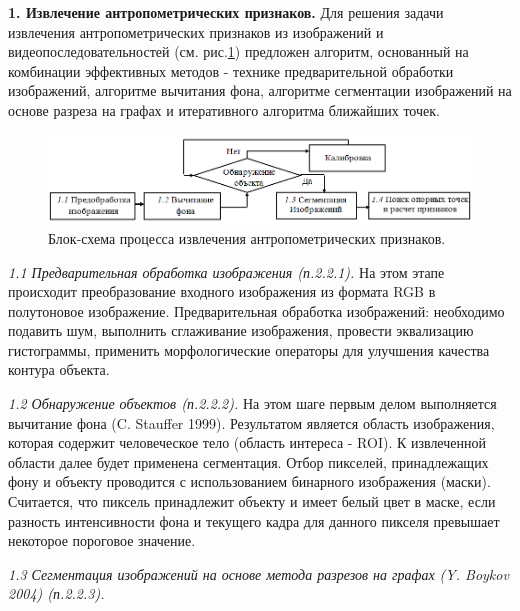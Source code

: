 \textbf{1. Извлечение антропометрических признаков.} Для решения задачи извлечения антропометрических признаков из изображений и видеопоследовательностей (см. рис.\ref{img53}) предложен алгоритм, основанный на комбинации эффективных методов - технике предварительной обработки изображений, алгоритме вычитания фона, алгоритме сегментации изображений на основе разреза на графах и итеративного алгоритма ближайших точек.
\begin{figure}[ht!]
\centering
\includegraphics [width=1\linewidth] {images/h53.png}
\begin{center}
\caption{Блок-схема процесса извлечения антропометрических признаков.} \label{img53}
\end{center}
\end{figure}

\textit{1.1 Предварительная обработка изображения (п.2.2.1).} На этом этапе происходит преобразование входного изображения из формата RGB в полутоновое изображение. Предварительная обработка изображений: необходимо подавить шум, выполнить сглаживание изображения, провести эквализацию гистограммы, применить морфологические операторы для улучшения качества контура объекта. 

\textit{1.2 Обнаружение объектов (п.2.2.2).} На этом шаге первым делом выполняется вычитание фона (C. Stauffer 1999). Результатом является область изображения, которая содержит человеческое тело (область интереса - ROI). К извлеченной области далее будет применена сегментация. Отбор пикселей, принадлежащих фону и объекту проводится с использованием бинарного изображения (маски). Считается, что пиксель принадлежит объекту и имеет белый цвет в маске, если разность интенсивности фона и текущего кадра для данного пикселя превышает некоторое пороговое значение.

\textit{1.3 Сегментация изображений на основе метода разрезов на графах (Y. Boykov 2004) (п.2.2.3).} 

